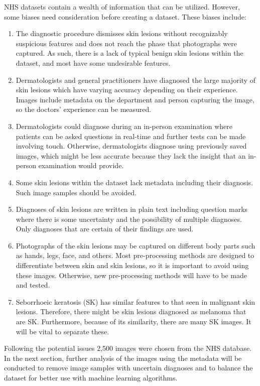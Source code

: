 NHS datasets contain a wealth of information that can be utilized. However, some biases need consideration before creating a dataset. These biases include:
\begin{enumerate}
    \item The diagnostic procedure dismisses skin lesions without recognizably suspicious features and does not reach the phase that photographs were captured. As such, there is a lack of typical benign skin lesions within the dataset, and most have some undesirable features.
    \item Dermatologists and general practitioners have diagnosed the large majority of skin lesions which have varying accuracy depending on their experience. Images include metadata on the department and person capturing the image, so the doctors' experience can be measured.
    \item Dermatologists could diagnose during an in-person examination where patients can be asked questions in real-time and further tests can be made involving touch. Otherwise, dermatologists diagnose using previously saved images, which might be less accurate because they lack the insight that an in-person examination would provide.
    \item Some skin lesions within the dataset lack metadata including their diagnosis. Such image samples should be avoided.
    \item Diagnoses of skin lesions are written in plain text including question marks where there is some uncertainty and the possibility of multiple diagnoses. Only diagnoses that are certain of their findings are used.
    \item Photographs of the skin lesions may be captured on different body parts such as hands, legs, face, and others. Most pre-processing methods are designed to differentiate between skin and skin lesions, so it is important to avoid using these images. Otherwise, new pre-processing methods will have to be made and tested.
    \item Seborrhoeic keratosis (SK) has similar features to that seen in malignant skin lesions. Therefore, there might be skin lesions diagnosed as melanoma that are SK. Furthermore, because of its similarity, there are many SK images. It will be vital to separate these.
\end{enumerate}

Following the potential issues 2,500 images were chosen from the NHS database. In the next section, further analysis of the images using the metadata will be conducted to remove image samples with uncertain diagnoses and to balance the dataset for better use with machine learning algorithms.

